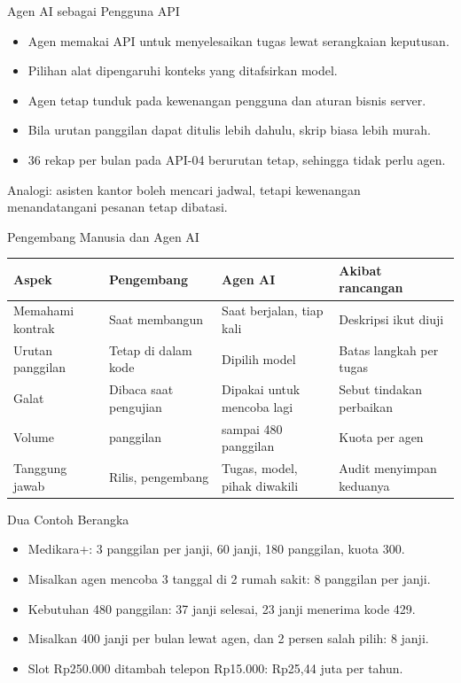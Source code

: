 \documentclass[aspectratio=169, table, 12pt]{beamer}
\begin{document}
\begin{frame}{{\Large Agen AI sebagai Pengguna API}}
  \vspace{8pt}
  \begin{itemize}
    \item Agen memakai API untuk menyelesaikan tugas lewat serangkaian keputusan.
    \item Pilihan alat dipengaruhi konteks yang ditafsirkan model.
    \item Agen tetap tunduk pada kewenangan pengguna dan aturan bisnis server.
    \item Bila urutan panggilan dapat ditulis lebih dahulu, skrip biasa lebih murah.
    \item 36 rekap per bulan pada API-04 berurutan tetap, sehingga tidak perlu agen.
  \end{itemize}
  \vspace{6pt}
  {\small Analogi: asisten kantor boleh mencari jadwal, tetapi kewenangan menandatangani pesanan tetap dibatasi.}
\end{frame}

\begin{frame}{{\Large Pengembang Manusia dan Agen AI}}
  \footnotesize
  \begin{tabularx}{\textwidth}{>{\raggedright\arraybackslash}p{2.5cm} >{\raggedright\arraybackslash}X >{\raggedright\arraybackslash}X >{\raggedright\arraybackslash}X}
    \hline
    \textbf{Aspek} & \textbf{Pengembang} & \textbf{Agen AI} & \textbf{Akibat rancangan} \\ \hline
    Memahami kontrak & Saat membangun & Saat berjalan, tiap kali & Deskripsi ikut diuji \\ \hline
    Urutan panggilan & Tetap di dalam kode & Dipilih model & Batas langkah per tugas \\ \hline
    Galat & Dibaca saat pengujian & Dipakai untuk mencoba lagi & Sebut tindakan perbaikan \\ \hline
    Volume & 180 panggilan & 240 sampai 480 panggilan & Kuota per agen \\ \hline
    Tanggung jawab & Rilis, pengembang & Tugas, model, pihak diwakili & Audit menyimpan keduanya \\ \hline
  \end{tabularx}
\end{frame}

\begin{frame}{{\Large Dua Contoh Berangka}}
  \vspace{8pt}
  \begin{itemize}
    \item Medikara+: 3 panggilan per janji, 60 janji, 180 panggilan, kuota 300.
    \item Misalkan agen mencoba 3 tanggal di 2 rumah sakit: 8 panggilan per janji.
    \item Kebutuhan 480 panggilan: 37 janji selesai, 23 janji menerima kode 429.
    \item Misalkan 400 janji per bulan lewat agen, dan 2 persen salah pilih: 8 janji.
    \item Slot Rp250.000 ditambah telepon Rp15.000: Rp25,44 juta per tahun.
  \end{itemize}
\end{frame}
\end{document}
